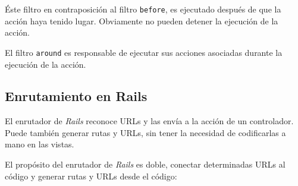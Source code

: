 Éste filtro en contraposición al filtro \texttt{before}, es ejecutado después de que la acción haya tenido lugar. Obviamente no pueden detener la ejecución de la acción.

El filtro \texttt{around} es responsable de ejecutar sus acciones asociadas durante la ejecución de la acción.


\subsection{Enrutamiento en Rails}

El enrutador de \textit{Rails} reconoce URLs y las envía a la acción de un controlador. Puede también generar rutas y URLs, sin tener la necesidad de codificarlas a mano en las vistas.

El propósito del enrutador de \textit{Rails} es doble, conectar determinadas URLs al código y generar rutas y URLs desde el código:

